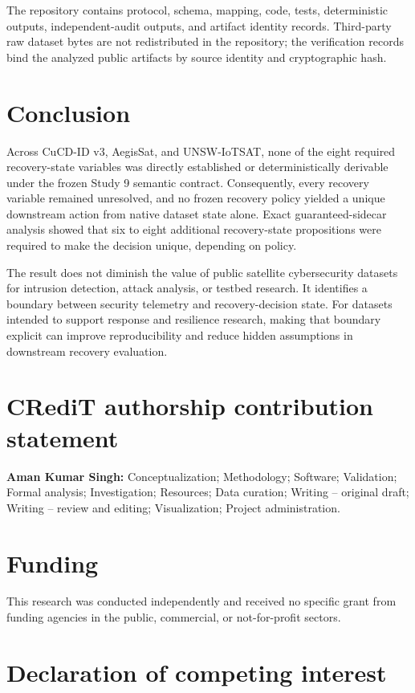 \documentclass[preprint,12pt]{elsarticle}
\begin{document}
The repository contains protocol, schema, mapping, code, tests, deterministic outputs, independent-audit outputs, and artifact identity records. Third-party raw dataset bytes are not redistributed in the repository; the verification records bind the analyzed public artifacts by source identity and cryptographic hash.

\section{Conclusion}

Across CuCD-ID v3, AegisSat, and UNSW-IoTSAT, none of the eight required recovery-state variables was directly established or deterministically derivable under the frozen Study 9 semantic contract. Consequently, every recovery variable remained unresolved, and no frozen recovery policy yielded a unique downstream action from native dataset state alone. Exact guaranteed-sidecar analysis showed that six to eight additional recovery-state propositions were required to make the decision unique, depending on policy.

The result does not diminish the value of public satellite cybersecurity datasets for intrusion detection, attack analysis, or testbed research. It identifies a boundary between security telemetry and recovery-decision state. For datasets intended to support response and resilience research, making that boundary explicit can improve reproducibility and reduce hidden assumptions in downstream recovery evaluation.

\section*{CRediT authorship contribution statement}

\textbf{Aman Kumar Singh:} Conceptualization; Methodology; Software; Validation; Formal analysis; Investigation; Resources; Data curation; Writing -- original draft; Writing -- review and editing; Visualization; Project administration.

\section*{Funding}

This research was conducted independently and received no specific grant from funding agencies in the public, commercial, or not-for-profit sectors.

\section*{Declaration of competing interest}
\end{document}
